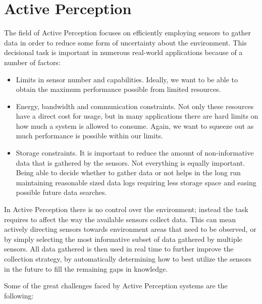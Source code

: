 \section{Active Perception}

The field of Active Perception focuses on efficiently employing sensors to gather data in order to
reduce some form of uncertainty about the environment. This decisional task is important in numerous
real-world applications because of a number of factors:

\begin{itemize}
\item Limits in sensor number and capabilities. Ideally, we want to be able to obtain the maximum
performance possible from limited resources.
\item Energy, bandwidth and communication constraints. Not only these resources have a direct cost for
usage, but in many applications there are hard limits on how much a system is allowed to consume.
Again, we want to squeeze out as much performance is possible within our limits.
\item Storage constraints. It is important to reduce the amount of non-informative data that is gathered
by the sensors. Not everything is equally important. Being able to decide whether to gather data or
not helps in the long run maintaining reasonable sized data logs requiring less storage space and
easing possible future data searches.
\end{itemize}

In Active Perception there is no control over the environment; instead the task requires to affect
the way the available sensors collect data. This can mean actively directing sensors towards
environment areas that need to be observed, or by simply selecting the most informative subset
of data gathered by multiple sensors. All data gathered is then used in real time to further improve
the collection strategy, by automatically determining how to best utilize the sensors in the future to
fill the remaining gaps in knowledge.

Some of the great challenges faced by Active Perception systems are the following:

